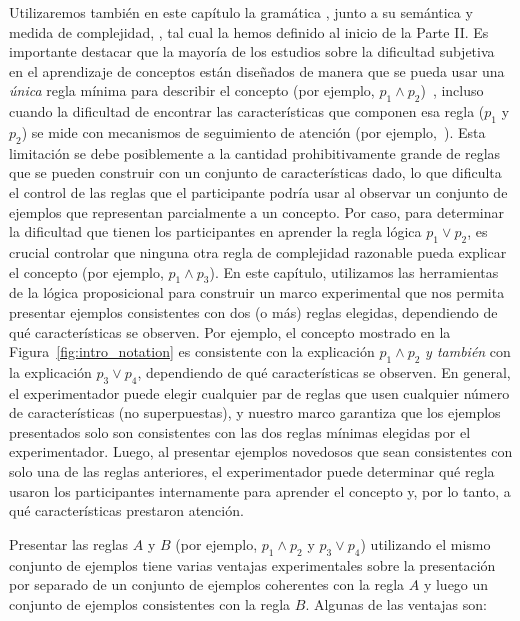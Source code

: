 Utilizaremos también en este capítulo la gramática \grambool, junto a su semántica y medida de complejidad, \mdlbool, tal cual la hemos definido al inicio de la Parte II. Es importante destacar que la mayoría de los estudios sobre la dificultad subjetiva en el aprendizaje de conceptos están diseñados de manera que se pueda usar una {\em única} regla mínima para describir el concepto (por ejemplo, $p_1 \land p_2$)~\cite{ashby2005human,feldman2000minimization}, incluso cuando la dificultad de encontrar las características que componen esa regla ($p_1$ y $p_2$) se mide con mecanismos de seguimiento de atención (por ejemplo,~\cite{blair2009extremely, hoffman2010costs}). Esta limitación se debe posiblemente a la cantidad prohibitivamente grande de reglas que se pueden construir con un conjunto de características dado, lo que dificulta el control de las reglas que el participante podría usar al observar un conjunto de ejemplos que representan parcialmente a un concepto. Por caso, para determinar la dificultad que tienen los participantes en aprender la regla lógica $p_1 \lor p_2$, es crucial controlar que ninguna otra regla de complejidad razonable pueda explicar el concepto (por ejemplo, $p_1 \land p_3$). En este capítulo, utilizamos las herramientas de la lógica proposicional para construir un marco experimental que nos permita presentar ejemplos consistentes con dos (o más) reglas elegidas, dependiendo de qué características se observen. Por ejemplo, el concepto mostrado en la Figura~\ref{fig:intro_notation} es consistente con la explicación $p_1 \land p_2$ \textit {y también} con la explicación $p_3 \lor p_4$, dependiendo de qué características se observen. En general, el experimentador puede elegir cualquier par de reglas que usen cualquier número de características (no superpuestas), y nuestro marco garantiza que los ejemplos presentados solo son consistentes con las dos reglas mínimas elegidas por el experimentador. Luego, al presentar ejemplos novedosos que sean consistentes con solo una de las reglas anteriores, el experimentador puede determinar qué regla usaron los participantes internamente para aprender el concepto y, por lo tanto, a qué características prestaron atención.


Presentar las reglas $A$ y $B$ (por ejemplo, $p_1\land p_2$ y $p_3 \lor p_4$) utilizando el mismo conjunto de ejemplos tiene varias ventajas experimentales sobre la presentación por separado de un conjunto de ejemplos coherentes con la regla $A$ y luego un conjunto de ejemplos consistentes con la regla $B$. Algunas de las ventajas son:

